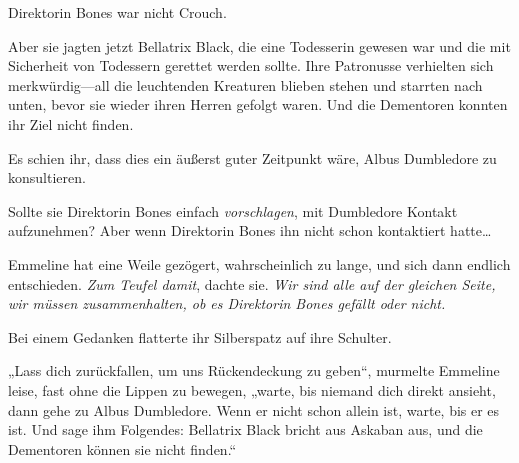 Direktorin Bones war nicht Crouch.

Aber sie jagten jetzt Bellatrix Black, die eine Todesserin gewesen war und die mit Sicherheit von Todessern gerettet werden sollte. Ihre Patronusse verhielten sich merkwürdig—all die leuchtenden Kreaturen blieben stehen und starrten nach unten, bevor sie wieder ihren Herren gefolgt waren. Und die Dementoren konnten ihr Ziel nicht finden.

Es schien ihr, dass dies ein äußerst guter Zeitpunkt wäre, Albus Dumbledore zu konsultieren.

Sollte sie Direktorin Bones einfach \emph{vorschlagen}, mit Dumbledore Kontakt aufzunehmen? Aber wenn Direktorin Bones ihn nicht schon kontaktiert hatte…

Emmeline hat eine Weile gezögert, wahrscheinlich zu lange, und sich dann endlich entschieden. \emph{Zum Teufel damit}, dachte sie. \emph{Wir sind alle auf der gleichen Seite, wir müssen zusammenhalten, ob es Direktorin Bones gefällt oder nicht.}

Bei einem Gedanken flatterte ihr Silberspatz auf ihre Schulter.

„Lass dich zurückfallen, um uns Rückendeckung zu geben“, murmelte Emmeline leise, fast ohne die Lippen zu bewegen, „warte, bis niemand dich direkt ansieht, dann gehe zu Albus Dumbledore. Wenn er nicht schon allein ist, warte, bis er es ist. Und sage ihm Folgendes: Bellatrix Black bricht aus Askaban aus, und die Dementoren können sie nicht finden.“

